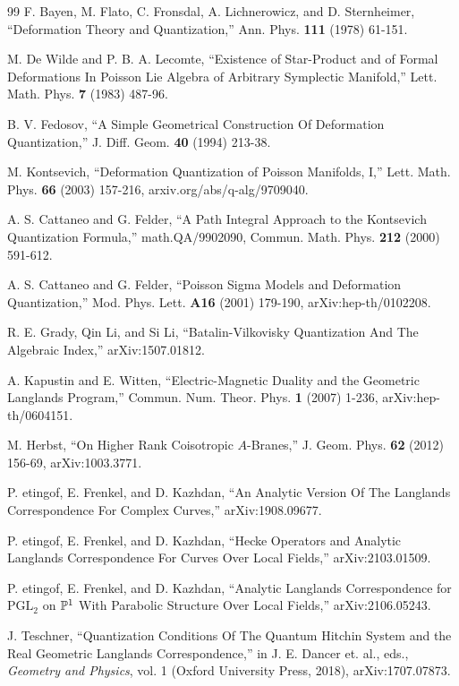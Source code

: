 \begin{thebibliography}{99}
F. Bayen, M. Flato, C. Fronsdal, A. Lichnerowicz, and D. Sternheimer, ``Deformation Theory and Quantization,''
Ann. Phys. {\bf 111} (1978) 61-151.

M. De Wilde and P. B. A. Lecomte, ``Existence of Star-Product and of Formal Deformations In Poisson
Lie Algebra of Arbitrary Symplectic Manifold,'' Lett. Math. Phys. {\bf 7} (1983) 487-96.

B. V. Fedosov, ``A Simple Geometrical Construction Of Deformation Quantization,'' J. Diff. Geom. {\bf 40} (1994) 213-38.



M. Kontsevich, ``Deformation Quantization of Poisson Manifolds, I,''    
Lett. Math. Phys.  {\bf 66} (2003) 157-216,
arxiv.org/abs/q-alg/9709040.

A. S. Cattaneo and G. Felder, 		``A Path Integral Approach to the Kontsevich Quantization Formula,''
math.QA/9902090, Commun. Math. Phys. {\bf 212} (2000) 591-612.

A. S. Cattaneo and G. Felder, ``Poisson Sigma Models and Deformation Quantization,''  Mod. Phys. Lett. {\bf A16} (2001) 
179-190, arXiv:hep-th/0102208.

R. E. Grady, Qin Li, and Si Li, ``Batalin-Vilkovisky Quantization And The
Algebraic Index,'' arXiv:1507.01812.


A. Kapustin and E. Witten, 
``Electric-Magnetic Duality and the Geometric Langlands Program,''   Commun. Num. Theor. Phys.
{\bf 1} (2007) 1-236,
arXiv:hep-th/0604151.

M. Herbst, ``On Higher Rank Coisotropic $A$-Branes,'' J. Geom. Phys. {\bf 62} (2012) 156-69, arXiv:1003.3771.

P. etingof, E. Frenkel, and D. Kazhdan, ``An Analytic Version Of The Langlands Correspondence For Complex Curves,'' 
arXiv:1908.09677.

P. etingof, E. Frenkel, and D. Kazhdan, ``Hecke Operators and Analytic Langlands Correspondence For Curves Over Local Fields,''
arXiv:2103.01509.

P. etingof, E. Frenkel, and D. Kazhdan, ``Analytic Langlands Correspondence for $\mathrm{PGL}_2$ on ${\Bbb P}^1$ With Parabolic
Structure Over Local Fields,'' arXiv:2106.05243.


J. Teschner, ``Quantization Conditions Of The Quantum Hitchin System and the Real Geometric Langlands Correspondence,'' in J. E. Dancer 
et. al., eds., {\it Geometry and Physics}, vol. 1 (Oxford University Press, 2018),
arXiv:1707.07873.




\end{thebibliography}
